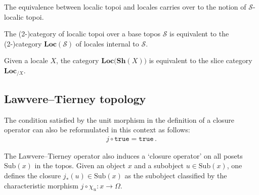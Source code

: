    The equivalence between localic topoi and locales carries over to the notion of $\mathcal{S}$-localic topoi.
    \begin{property}
        The (2-)category of localic topoi over a base topos $\mathcal{S}$ is equivalent to the (2-)category $\mathbf{Loc}(\mathcal{S})$ of locales internal to $\mathcal{S}$.
    \end{property}
    \begin{property}\label{topos:slice_locale}
        Given a locale $X$, the category $\mathbf{Loc}\big(\mathbf{Sh}(X)\big)$ is equivalent to the slice category $\mathbf{Loc}_{/X}$.
    \end{property}

\subsection{Lawvere--Tierney topology}

    \begin{remark}
        The condition satisfied by the unit morphism in the definition of a closure operator can also be reformulated in this context as follows:
        \begin{gather}
            j\circ\texttt{true} = \texttt{true}\,.
        \end{gather}
    \end{remark}
    The Lawvere--Tierney operator also induces a `closure operator' on all posets $\mathrm{Sub}(x)$ in the topos. Given an object $x$ and a subobject $u\in\text{Sub}(x)$, one defines the closure $j_\ast(u)\in\text{Sub}(x)$ as the subobject classified by the characteristic morphism $j\circ\chi_u:x\rightarrow\Omega$.

